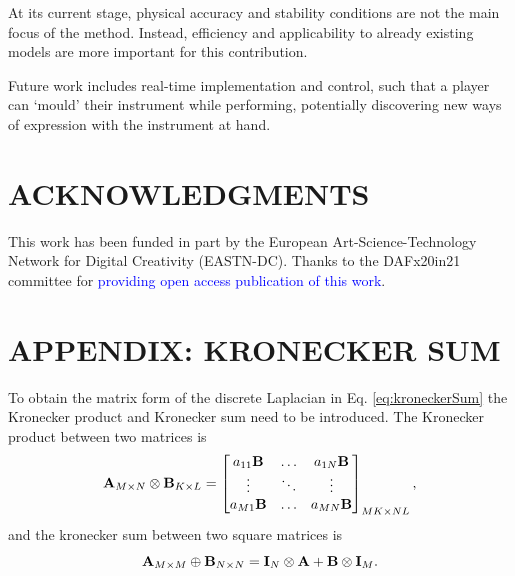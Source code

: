 \documentclass[fleqn]{jaes}
\def\SWcomment[#1]{\textcolor{blue}{#1}}
\begin{document}
At its current stage, physical accuracy and stability conditions are not the main focus of the method. Instead, efficiency and applicability to already existing models are more important for this contribution.

Future work includes real-time implementation and control, such that a player can `mould' their instrument while performing, potentially discovering new ways of expression with the instrument at hand.  

\section{ACKNOWLEDGMENTS}
This  work  has  been  funded  in  part  by  the European Art-Science-Technology Network for Digital Creativity (EASTN-DC). Thanks to the DAFx20in21 committee for \SWcomment[providing open access publication of this work].




\appendix
\section*{APPENDIX: KRONECKER SUM}\label{app:kronecker}
To obtain the matrix form of the discrete Laplacian in Eq. \eqref{eq:kroneckerSum} the Kronecker product and Kronecker sum need to be introduced. The Kronecker product between two matrices is \cite{Horn1991}
\begin{equation}
    \mathbf{A}_{M\times N} \otimes \mathbf{B}_{K\times L} = \begin{bmatrix}
        a_{11}\mathbf{B} & \hdots & a_{1N}\mathbf{B}\\
        \vdots & \ddots & \vdots\\
        a_{M1}\mathbf{B} & \hdots & a_{MN}\mathbf{B}\\
    \end{bmatrix}_{MK \times NL},
\end{equation}
and the kronecker sum between two square matrices is \cite{Hamilton2016}
\begin{equation}\label{eq:kronSum}
    \A_{M \times M} \oplus \B_{N \times N} = \I_N\otimes \A + \B \otimes\I_M.
\end{equation}
\end{document}
